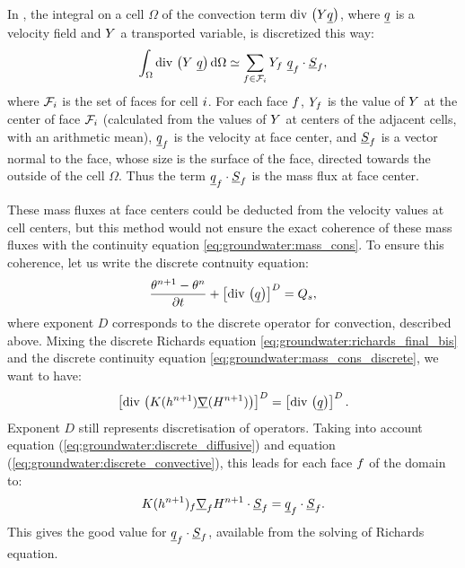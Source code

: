 In \CS, the integral on a cell $\Omega$ of the convection term $\text{div}\, \left( Y \underline{q} \right)$, where $\underline{q}$ is a velocity field
and $Y$ a transported variable, is discretized this way:
\begin{equation}
 \label{eq:groundwater:discrete_convective}
\int_{\Omega} \text{div}\, \left( Y \ \underline{q} \right) \mathrm{d} \Omega \simeq \sum_{{f} \in \mathcal{F}_{i}} Y_{f} \ \underline{q}_{f} \cdot \underline{S}_{f},
\end{equation}
where $\mathcal{F}_{i}$ is the set of faces for cell $i$. For each face ${f}$,
$Y_{f}$ is the value of $Y$ at the center of face $\mathcal{F}_{i}$ (calculated from the values of $Y$ at centers of the adjacent cells,
with an arithmetic mean), $\underline{q}_{f}$ is the velocity at face center, and $\underline{S}_{f}$ is a vector normal to the face,
whose size is the surface of the face, directed towards the outside of the cell $\Omega$.
Thus the term $\underline{q}_{f} \cdot \underline{S}_{f}$ is the mass flux at face center.

These mass fluxes at face centers could be deducted from the velocity values at cell centers, but this method would not ensure the exact
coherence of these mass fluxes with the continuity equation \eqref{eq:groundwater:mass_cons}.
To ensure this coherence, let us write the discrete contnuity equation:
\begin{equation}
 \label{eq:groundwater:mass_cons_discrete}
\frac{\theta^{n+1}-\theta^n}{\partial t} + \left[ \text{div}\, \left( \underline{q} \right) \right]^D = Q_s,
\end{equation}
where exponent $D$ corresponds to the discrete operator for convection, described above.
Mixing the discrete Richards equation \eqref{eq:groundwater:richards_final_bis} and the discrete continuity equation \eqref{eq:groundwater:mass_cons_discrete}, we want to have:
\begin{equation}
 \label{eq:groundwater:discrete_egality}
\left[ \text{div}\, \left( K(h^{n+1}) \underline{\nabla}(H^{n+1}) \right) \right]^D = \left[ \text{div}\, \left( \underline{q} \right) \right]^D.
\end{equation}
Exponent $D$ still represents discretisation of operators.
Taking into account equation (\eqref{eq:groundwater:discrete_diffusive}) and equation (\eqref{eq:groundwater:discrete_convective}), this leads for each face ${f}$ of the domain to:
\begin{equation}
 \label{eq:groundwater:verification}
K(h^{n+1})_{f} \underline{\nabla}_f H^{n+1}\cdot \underline{S}_{f} = \underline{q}_{f} \cdot \underline{S}_{f}.
\end{equation}
This gives the good value for $\underline{q}_{f}\cdot \underline{S}_{f}$, available from the solving of Richards equation.

